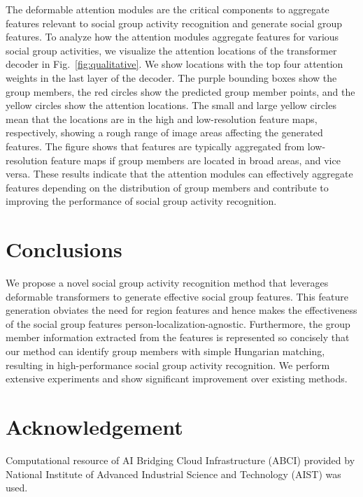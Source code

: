 \documentclass[runningheads]{llncs}
\begin{document}
The deformable attention modules are the critical components to aggregate features relevant to social group activity recognition and generate social group features. To analyze how the attention modules aggregate features for various social group activities, we visualize the attention locations of the transformer decoder in Fig.~\ref{fig:qualitative}. We show locations with the top four attention weights in the last layer of the decoder. The purple bounding boxes show the group members, the red circles show the predicted group member points, and the yellow circles show the attention locations. The small and large yellow circles mean that the locations are in the high and low-resolution feature maps, respectively, showing a rough range of image areas affecting the generated features. The figure shows that features are typically aggregated from low-resolution feature maps if group members are located in broad areas, and vice versa. These results indicate that the attention modules can effectively aggregate features depending on the distribution of group members and contribute to improving the performance of social group activity recognition.

\section{Conclusions}
We propose a novel social group activity recognition method that leverages deformable transformers to generate effective social group features. 
This feature generation obviates the need for region features and hence makes the effectiveness of the social group features person-localization-agnostic.
Furthermore, the group member information extracted from the features is represented so concisely that our method can identify group members with simple Hungarian matching, resulting in high-performance social group activity recognition. 
We perform extensive experiments and show significant improvement over existing methods.

\section*{Acknowledgement}
Computational resource of AI Bridging Cloud Infrastructure (ABCI) provided by National Institute of Advanced Industrial Science and Technology (AIST) was used.




\renewcommand{\thesection}{\Alph{section}}
\setcounter{section}{0}
\end{document}
